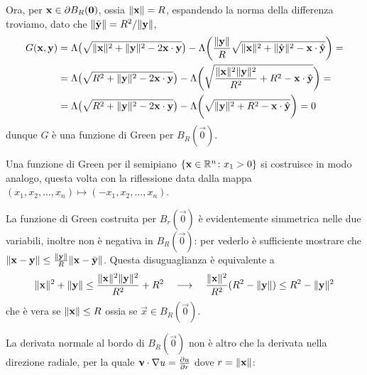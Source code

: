 Ora, per $\mathbf{x}\in\partial B_R(\mathbf{0})$, ossia $\lVert\mathbf{x}\rVert=R$, espandendo la norma della differenza troviamo, dato che $\lVert\bar{\mathbf{y}}\rVert=R^2/\lVert\mathbf{y}\rVert$,
\begin{equation}
    \begin{split}
        G(\mathbf{x},\mathbf{y})&=
        \Lambda\bigl(\sqrt{\lVert\mathbf{x}\rVert^2+\lVert\mathbf{y}\rVert^2-2{\mathbf{x}}\cdot{\mathbf{y}}}\bigr)-\Lambda\biggl(\frac{\lVert\mathbf{y}\rVert}{R}\sqrt{\lVert\mathbf{x}\rVert^2+\lVert\hat{\mathbf{y}}\rVert^2-{\mathbf{x}}\cdot{\hat{\mathbf{y}}}}\biggr)=\\&=
        \Lambda\bigl(\sqrt{R^2+\lVert\mathbf{y}\rVert^2-2{\mathbf{x}}\cdot{\mathbf{y}}}\bigr)-\Lambda\biggl(\sqrt{\frac{\lVert\mathbf{x}\rVert^2\lVert\mathbf{y}\rVert^2}{R^2}+R^2-{\mathbf{x}}\cdot{\hat{\mathbf{y}}}}\biggr)=\\&=
        \Lambda\bigl(\sqrt{R^2+\lVert\mathbf{y}\rVert^2-2{\mathbf{x}}\cdot{\mathbf{y}}}\bigr)-\Lambda\biggl(\sqrt{\lVert\mathbf{y}\rVert^2+R^2-{\mathbf{x}}\cdot{\hat{\mathbf{y}}}}\biggr)=
        0
    \end{split}
\end{equation}
dunque $G$ è una funzione di Green per $B_R(\vec 0)$.
\begin{esempio} \label{es:funzione-green-semipiano}
    Una funzione di Green per il semipiano $\{\mathbf{x}\in\mathbb{R}^n\colon x_1>0\}$ si costruisce in modo analogo, questa volta con la riflessione data dalla mappa $(x_1,x_2,\dotsc,x_n)\mapsto(-x_1,x_2,\dotsc,x_n)$.
\end{esempio}
\begin{osservazione} \label{o:funzione-green-simmetrica}
    La funzione di Green costruita per $B_r(\vec 0)$ è evidentemente simmetrica nelle due variabili, inoltre non è negativa in $B_R(\vec 0)$: per vederlo è sufficiente mostrare che $\lVert\mathbf{x}-\mathbf{y}\rVert\le\frac{\lVert\mathbf{y}\rVert}{R}\lVert\mathbf{x}-\bar{\mathbf{y}}\rVert$.
    Questa disuguaglianza è equivalente a
    \begin{equation}
        \lVert\mathbf{x}\rVert^2+\lVert\mathbf{y}\rVert\le\frac{\lVert\mathbf{x}\rVert^2\lVert\mathbf{y}\rVert^2}{R^2}+R^2
        \quad\longrightarrow\quad
        \frac{\lVert\mathbf{x}\rVert^2}{R^2}(R^2-\lVert\mathbf{y}\rVert)\le R^2-\lVert\mathbf{y}\rVert^2
    \end{equation}
    che è vera se $\lVert\mathbf{x}\rVert\le R$ ossia se $\vec x\in B_R(\vec 0)$.
\end{osservazione}
La derivata normale al bordo di $B_R(\vec 0)$ non è altro che la derivata nella direzione radiale, per la quale ${\bm{\upnu}}\cdot{\nabla u}=\frac{\partial {u}}{\partial {r}}$ dove $r=\lVert\mathbf{x}\rVert$:
